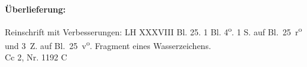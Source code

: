 ﻿      
               
                \begin{ledgroupsized}[r]{120mm}
                \footnotesize 
                \pstart             
                \noindent\textbf{\"{U}berlieferung:}   
                \pend
                \end{ledgroupsized}
            
              
                            \begin{ledgroupsized}[r]{114mm}
                            \footnotesize 
                            \pstart \parindent -6mm
                            Reinschrift mit Verbesserungen: LH XXXVIII Bl. 25. 1 Bl. 4\textsuperscript{o}. 1 S. auf Bl.~25~r\textsuperscript{o} und 3~Z. auf Bl.~25~v\textsuperscript{o}. Fragment eines Wasserzeichens.
\\ Cc 2, Nr. 1192 C 
\pend
                            \end{ledgroupsized}
            
